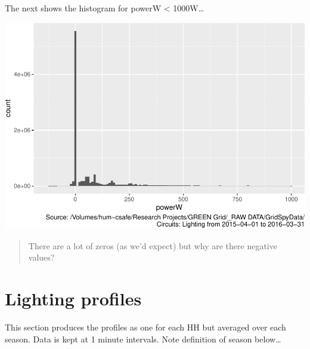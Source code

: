 \documentclass[]{article}
\begin{document}
The next shows the histogram for powerW \textless{} 1000W\ldots{}

\includegraphics{nzGGHouseholdPowerDemandProfile_Lighting_2015-04-01_2016-03-31_files/figure-latex/histo power under 1000-1.pdf}

\begin{quote}
There are a lot of zeros (as we'd expect) but why are there negative
values?
\end{quote}

\section{Lighting profiles}\label{lighting-profiles}

This section produces the profiles as one for each HH but averaged over
each season. Data is kept at 1 minute intervals. Note definition of
season below\ldots{}
\end{document}
